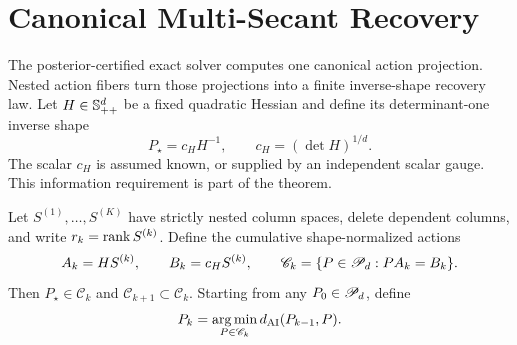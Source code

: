 \section{Canonical Multi-Secant Recovery}
\label{sec:multisecant-recovery}

The posterior-certified exact solver computes one canonical action projection.  Nested action
fibers turn those projections into a finite inverse-shape recovery law.  Let
\(H\in\mathbb{S}_{++}^d\) be a fixed quadratic Hessian and define its determinant-one
inverse shape
\begin{equation}
  P_\star=c_HH^{-1},
  \qquad c_H=(\det H)^{1/d}.
  \label{eq:inverse-shape}
\end{equation}
The scalar \(c_H\) is assumed known, or supplied by an independent scalar
gauge.  This information requirement is part of the theorem.

Let \(S^{(1)},\ldots,S^{(K)}\) have strictly nested column spaces, delete
dependent columns, and write \(r_k=\operatorname{rank} S^{(k)}\).  Define the cumulative
shape-normalized actions
\begin{equation}
  A_k=HS^{(k)},
  \qquad B_k=c_HS^{(k)},
  \qquad
  \mathscr C_k=\{P\in\mathscr P_d:PA_k=B_k\}.
  \label{eq:nested-action-fibers}
\end{equation}
Then \(P_\star\in\mathscr C_k\) and
\(\mathscr C_{k+1}\subset\mathscr C_k\).  Starting from any
\(P_0\in\mathscr P_d\), define
\begin{equation}
  P_k=\operatorname*{arg\,min}_{P\in\mathscr C_k}d_{\mathrm{AI}}(P_{k-1},P).
  \label{eq:canonical-multisecant-update}
\end{equation}

